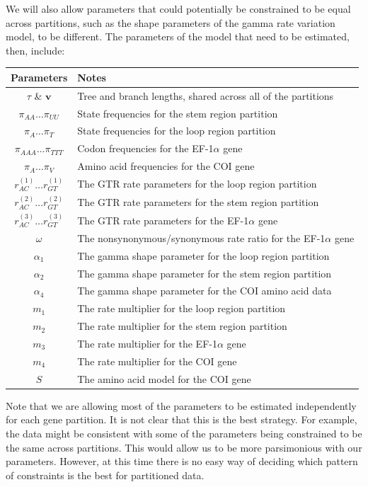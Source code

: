 \documentclass{svmult}
\begin{document}
We will also allow parameters that could potentially be constrained to be equal across partitions, such as the shape parameters of the gamma rate variation
model, to be different. The parameters of the model that need to be estimated, then, include:
\begin{center}
\begin{tabular}{cl}
Parameters & Notes \\ \hline
 $\tau$ \& ${\mathbf v}$ & Tree and branch lengths, shared across all of the partitions \\
 $\pi_{AA} \ldots \pi_{UU}$ & State frequencies for the stem region partition \\
 $\pi_{A} \ldots \pi_{T}$ & State frequencies for the loop region partition \\
 $\pi_{AAA} \ldots \pi_{TTT}$ & Codon frequencies for the EF-1$\alpha$ gene \\
 $\pi_{A} \ldots \pi_{V}$ & Amino acid frequencies for the COI gene \\
 $r^{(1)}_{AC} \ldots r^{(1)}_{GT}$ & The GTR rate parameters for the loop region partition\\
 $r^{(2)}_{AC} \ldots r^{(2)}_{GT}$ & The GTR rate parameters for the stem region partition\\
 $r^{(3)}_{AC} \ldots r^{(3)}_{GT}$ & The GTR rate parameters for the EF-1$\alpha$ gene \\
 $\omega$ & The nonsynonymous/synonymous rate ratio for the EF-1$\alpha$ gene\\
 $\alpha_1$ & The gamma shape parameter for the loop region partition \\
 $\alpha_2$ & The gamma shape parameter for the stem region partition \\
 $\alpha_4$ & The gamma shape parameter for the COI amino acid data\\
 $m_1$ & The rate multiplier for the loop region partition \\
 $m_2$ & The rate multiplier for the stem region partition \\
 $m_3$ & The rate multiplier for the EF-1$\alpha$ gene \\
 $m_4$ & The rate multiplier for the COI gene \\
 $S$ & The amino acid model for the COI gene \\
\end{tabular}
\end{center}
Note that we are allowing most of the parameters to be estimated independently for each gene partition. It is not clear that this is the best strategy.
For example, the data might be consistent with some of the parameters being constrained to be the same across partitions. This would allow us
to be more parsimonious with our parameters. However, at this time there is no easy way of deciding which pattern of constraints is the best for
partitioned data.
\end{document}
